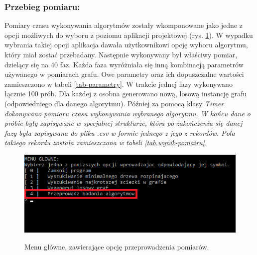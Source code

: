 \documentclass[a4paper,12pt]{article}
\begin{document}
\subsubsection{Przebieg pomiaru:}
Pomiary czasu wykonywania algorytmów zostały wkomponowane jako jedne z opcji możliwych do wyboru z poziomu aplikacji projektowej (rys. \ref{fig.opcja-badanie}). W wypadku wybrania takiej opcji aplikacja dawała użytkownikowi opcję wyboru algorytmu, który miał zostać przebadany. Następnie wykonywany był właściwy pomiar, dzielący się na 40 faz. Każda faza wyróżniała się inną kombinacją parametrów używanego w pomiarach grafu. Owe parametry oraz ich dopuszczalne wartości zamieszczono w tabeli \ref{tab-parametry}. W trakcie jednej fazy wykonywano łącznie 100 prób. Dla każdej z osobna generowano nową, losową instancję grafu (odpowiedniego dla danego algorytmu). Później za pomocą klasy \it Timer \rm dokonywano pomiaru czasu wykonywania wybranego algorytmu. W końcu dane o próbie były zapisywane w specjalnej strukturze, która po zakończeniu się danej fazy była zapisywana do pliku \it *.csv \rm w formie jednego z jego z rekordów. Pola takiego rekordu została zamieszczona w tabeli \ref{tab.wynik-pomairu}.
\begin{figure}[H]
	\centering
	\caption{\centering Menu główne, zawierające opcję przeprowadzenia pomiarów.}
	\includegraphics[width=12cm]{fig1.png}
	\label{fig.opcja-badanie}
\end{figure}
\end{document}
